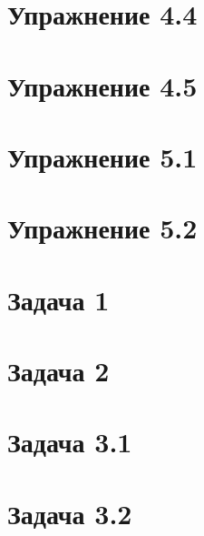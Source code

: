 \documentclass[a4paper]{article}
\begin{document}
\section*{Упражнение 4.4}
\section*{Упражнение 4.5}
\section*{Упражнение 5.1}
\section*{Упражнение 5.2}
\section*{Задача 1}
\section*{Задача 2}
\section*{Задача 3.1}
\section*{Задача 3.2}
\end{document}
